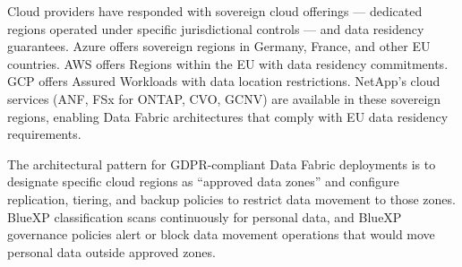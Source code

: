 Cloud providers have responded with sovereign cloud offerings --- dedicated regions operated under specific jurisdictional controls --- and data residency guarantees. Azure offers sovereign regions in Germany, France, and other EU countries. AWS offers Regions within the EU with data residency commitments. GCP offers Assured Workloads with data location restrictions. NetApp's cloud services (ANF, FSx for ONTAP, CVO, GCNV) are available in these sovereign regions, enabling Data Fabric architectures that comply with EU data residency requirements.

The architectural pattern for GDPR-compliant Data Fabric deployments is to designate specific cloud regions as ``approved data zones'' and configure replication, tiering, and backup policies to restrict data movement to those zones. BlueXP classification scans continuously for personal data, and BlueXP governance policies alert or block data movement operations that would move personal data outside approved zones.

